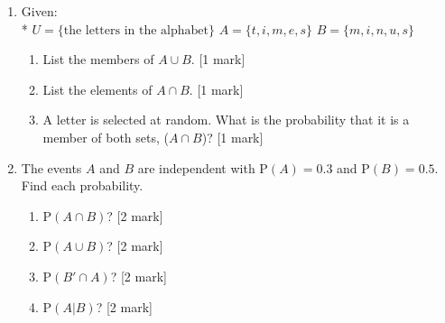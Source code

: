 \documentclass[12pt, twoside]{article}
\begin{document}
\begin{enumerate}
\subsubsection*{1.22 PreExam: Probability, Venn diagrams}
\item Given: \\*
    $U = \{\text{the letters in the alphabet}\}$ \qquad
    $A = \{t, i, m, e, s\}$ \qquad
    $B = \{m, i, n, u, s\}$
    \begin{enumerate}[itemsep=1cm]
        \item List the members of $A \cup B$. \hfill [1 mark]
        \item List the elements of $A \cap B$. \hfill [1 mark]
        \item A letter is selected at random. What is the probability that it is a member of both sets, ($A \cap B$)? \hfill [1 mark]
    \end{enumerate} \vspace{1cm}

\item The events $A$ and $B$ are independent with $\mathrm P(A)=0.3$ and $\mathrm P(B)=0.5$. Find each probability.
    \begin{enumerate}[itemsep=1cm]
        \item $\mathrm P(A \cap B)$? \hfill [2 mark]
        \item $\mathrm P(A \cup B)$? \hfill [2 mark]
        \item $\mathrm P(B' \cap A)$? \hfill [2 mark]
        \item $\mathrm P(A | B)$? \hfill [2 mark]
    \end{enumerate}



\end{enumerate}
\end{document}
